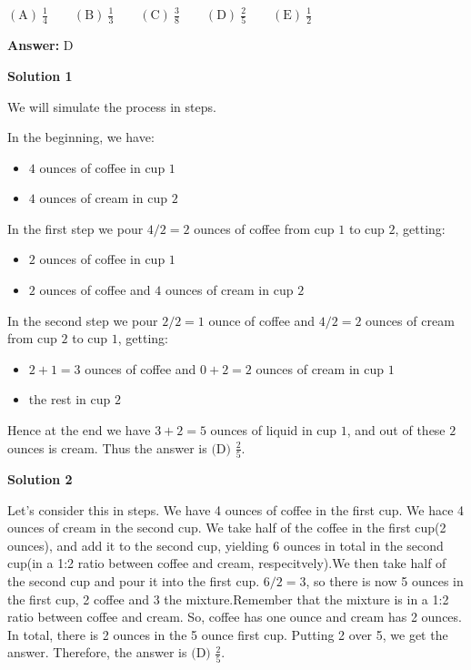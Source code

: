 \begin{enumerate}
 $\mathrm{(A) \ } \frac{1}{4}\qquad \mathrm{(B) \ } \frac13\qquad \mathrm{(C) \ } \frac38\qquad \mathrm{(D) \ } \frac25\qquad \mathrm{(E) \ } \frac12$

 \textbf{Answer: }D



\textbf{Solution 1}

We will simulate the process in steps.

 In the beginning, we have:

 
            \begin{itemize}
        \item $4$ ounces of coffee in cup $1$
        \item $4$ ounces of cream in cup $2$
            \end{itemize}
            In the first step we pour $4/2=2$ ounces of coffee from cup $1$ to cup $2$, getting:

 
            \begin{itemize}
        \item $2$ ounces of coffee in cup $1$
        \item $2$ ounces of coffee and $4$ ounces of cream in cup $2$
            \end{itemize}
            In the second step we pour $2/2=1$ ounce of coffee and $4/2=2$ ounces of cream from cup $2$ to cup $1$, getting:

 
            \begin{itemize}
        \item $2+1=3$ ounces of coffee and $0+2=2$ ounces of cream in cup $1$
        \item the rest in cup $2$
            \end{itemize}
            Hence at the end we have $3+2=5$ ounces of liquid in cup $1$, and out of these $2$ ounces is cream. Thus the answer is $\boxed{\text{(D) } \frac 25}$.

 



\textbf{Solution 2}

Let's consider this in steps. We have 4 ounces of coffee in the first cup. We hace 4 ounces of cream in the second cup. We take half of the coffee in the first cup(2 ounces), and add it to the second cup, yielding 6 ounces in total in the second cup(in a 1:2 ratio between coffee and cream, respecitvely).We then take half of the second cup and pour it into the first cup. $6/2=3$, so there is now 5 ounces in the first cup, 2 coffee and 3 the mixture.Remember that the mixture is in a 1:2 ratio between coffee and cream. So, coffee has one ounce and cream has 2 ounces. In total, there is 2 ounces in the 5 ounce first cup. Putting 2 over 5, we get the answer. Therefore, the answer is $\boxed{\text{(D) } \frac 25}$.


\end{enumerate}

